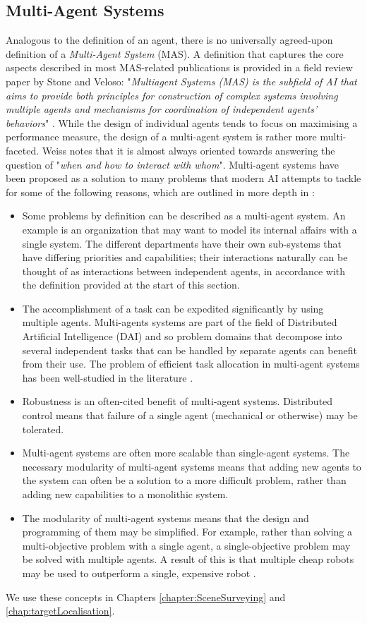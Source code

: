 \subsection{Multi-Agent Systems}
Analogous to the definition of an agent, there is no universally agreed-upon definition of a \emph{Multi-Agent System} (MAS). A definition that captures the core aspects described in most MAS-related publications is provided in a field review paper by Stone and Veloso: "\textit{Multiagent Systems (MAS) is the subfield of AI that aims to provide both principles for construction of  complex  systems  involving  multiple  agents  and  mechanisms  for  coordination  of  independent  agents’ behaviors}" \cite{Stone2000MultiagentPerspective}. While the design of individual agents tends to focus on maximising a performance measure, the design of a multi-agent system is rather more multi-faceted. Weiss \cite{MAS:AModernApproachToDAI} notes that it is almost always oriented towards answering the question of "\textit{when and how to interact with whom}". Multi-agent systems have been proposed as a solution to many problems that modern AI attempts to tackle for some of the following reasons, which are outlined in more depth in \cite{Stone2000MultiagentPerspective}: 
\begin{itemize}
    \item Some problems by definition can be described as a multi-agent system. An example is an organization that may want to model its internal affairs with a single system. The different departments have their own sub-systems that have differing priorities and capabilities; their interactions naturally can be thought of as interactions between independent agents, in accordance with the definition provided at the start of this section.
    \item The accomplishment of a task can be expedited significantly by using multiple agents. Multi-agents systems are part of the field of Distributed Artificial Intelligence (DAI) and so problem domains that decompose into several independent tasks that can be handled by separate agents can benefit from their use. The problem of efficient task allocation in multi-agent systems has been well-studied in the literature \cite{Gerkey2004ASystems}. 
    \item Robustness is an often-cited benefit of multi-agent systems. Distributed control means that failure of a single agent (mechanical or otherwise) may be tolerated.
    \item Multi-agent systems are often more scalable than single-agent systems. The necessary modularity of multi-agent systems means that adding new agents to the system can often be a solution to a more difficult problem, rather than adding new capabilities to a monolithic system. 
    \item The modularity of multi-agent systems means that the design and programming of them may be simplified. For example, rather than solving a multi-objective problem with a single agent, a single-objective problem may be solved with multiple agents. A result of this is that multiple cheap robots may be used to outperform a single, expensive robot \cite{Grabowski2000HeterogeneousExploration}.
\end{itemize}
We use these concepts in Chapters \ref{chapter:SceneSurveying} and \ref{chap:targetLocalisation}.
\par

